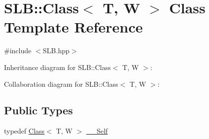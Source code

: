 \hypertarget{classSLB_1_1Class}{}\section{S\+LB\+:\+:Class$<$ T, W $>$ Class Template Reference}
\label{classSLB_1_1Class}


{\ttfamily \#include $<$S\+L\+B.\+hpp$>$}



Inheritance diagram for S\+LB\+:\+:Class$<$ T, W $>$\+:


Collaboration diagram for S\+LB\+:\+:Class$<$ T, W $>$\+:
\subsection*{Public Types}
\begin{DoxyCompactItemize}
\item 
typedef \hyperlink{classSLB_1_1Class}{Class}$<$ T, W $>$ \hyperlink{classSLB_1_1Class_aef6fc94f5e50c96268e669ab6946ad8b}{\+\_\+\+\_\+\+Self}
\end{DoxyCompactItemize}

